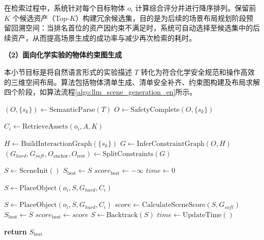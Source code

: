 在检索过程中，系统针对每个目标物体 $o_i$ 计算综合评分并进行降序排列。保留前 $K$ 个候选资产（Top-$K$）构建冗余候选集，目的是为后续的场景布局规划阶段预留回溯空间：当排名首位的资产因约束不满足时，系统可自动选择至候选集中的后续资产，从而提高场景生成的成功率与减少再次检索的耗时。


\noindent\textbf{（2）面向化学实验的物体约束图生成}


本小节目标是将自然语言形式的实验描述 $T$ 转化为符合化学安全规范和操作高效的三维空间布局。算法包括物体清单生成、清单安全补齐、约束图构建及布局求解四个阶段，如算法流程\ref{algo:llm_scene_generation_en}所示。
\begin{algorithm}[h]
\caption{大语言模型驱动的化学实验场景生成算法}
\label{algo:llm_scene_generation_en}
\begin{algorithmic}[1]

\STATE $(O,\{s_k\}) \gets \text{SemanticParse}(T)$
\STATE $O \gets \text{SafetyComplete}(O,\{s_k\})$

    \STATE $C_i \gets \text{RetrieveAssets}(o_i,A,K)$
\ENDFOR

\STATE $H \gets \text{BuildInteractionGraph}(\{s_k\})$
\STATE $G \gets \text{InferConstraintGraph}(O,H)$
\STATE $(G_{hard},G_{soft},O_{\text{anchor}},O_{\text{rest}}) \gets \text{SplitConstraints}(G)$

\STATE $S \gets \text{SceneInit}()$
\STATE $S_{\text{best}} \gets S$
\STATE $score_{\text{best}} \gets -\infty$
\STATE $time \gets 0$

        \STATE $S \gets \text{PlaceObject}(o_i,S,G_{hard},C_i)$
    \ENDFOR

        \STATE $S \gets \text{PlaceObject}(o_i,S,G_{hard},C_i)$
        \STATE $\textit{score} \gets \text{CalculateSceneScore}(S,G_{soft})$
            \STATE $S_{\text{best}} \gets S$
            \STATE $score_{\text{best}} \gets \textit{score}$
        \ELSE
            \STATE $S \gets \text{Backtrack}(S)$
        \ENDIF
    \ENDFOR
    \STATE $time \gets \text{UpdateTime}()$
\ENDWHILE

\STATE \textbf{return} $S_{\text{best}}$
\end{algorithmic}
\end{algorithm}



